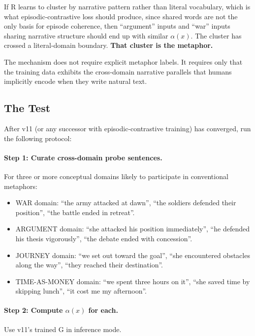 \documentclass[11pt, a4paper]{article}
\theoremstyle{plain}
\theoremstyle{definition}
\theoremstyle{remark}
\begin{document}
If R learns to cluster by narrative pattern rather than literal vocabulary, which is what episodic-contrastive loss should produce, since shared words are not the only basis for episode coherence, then ``argument'' inputs and ``war'' inputs sharing narrative structure should end up with similar $\alpha(x)$.
The cluster has crossed a literal-domain boundary.
\textbf{That cluster is the metaphor.}

The mechanism does not require explicit metaphor labels.
It requires only that the training data exhibits the cross-domain narrative parallels that humans implicitly encode when they write natural text.

\subsection{The Test}

After v11 (or any successor with episodic-contrastive training) has converged, run the following protocol:

\paragraph{Step 1: Curate cross-domain probe sentences.}
For three or more conceptual domains likely to participate in conventional metaphors:
\begin{itemize}[nosep]
\item WAR domain: ``the army attacked at dawn'', ``the soldiers defended their position'', ``the battle ended in retreat''.
\item ARGUMENT domain: ``she attacked his position immediately'', ``he defended his thesis vigorously'', ``the debate ended with concession''.
\item JOURNEY domain: ``we set out toward the goal'', ``she encountered obstacles along the way'', ``they reached their destination''.
\item TIME-AS-MONEY domain: ``we spent three hours on it'', ``she saved time by skipping lunch'', ``it cost me my afternoon''.
\end{itemize}

\paragraph{Step 2: Compute $\alpha(x)$ for each.}
Use v11's trained G in inference mode.
\end{document}
